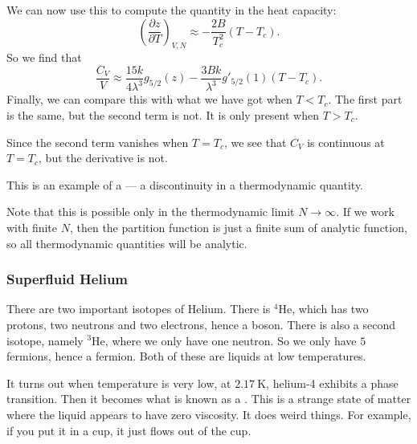 \documentclass[a4paper]{article}
\begin{document}
We can now use this to compute the quantity in the heat capacity:
\[
  \left(\frac{\partial z}{\partial T}\right)_{V, N} \approx -\frac{2B}{T_c^2}(T - T_c).
\]
So we find that
\[
  \frac{C_V}{V} \approx \frac{15 k}{4 \lambda^3} g_{5/2}(z) - \frac{3Bk}{\lambda^3} g'_{5/2}(1) (T - T_c).
\]
Finally, we can compare this with what we have got when $T < T_c$. The first part is the same, but the second term is not. It is only present when $T > T_c$.

Since the second term vanishes when $T = T_c$, we see that $C_V$ is continuous at $T = T_c$, but the derivative is not.
\begin{center}
\end{center}
This is an example of a  --- a discontinuity in a thermodynamic quantity.

Note that this is possible only in the thermodynamic limit $N \to \infty$. If we work with finite $N$, then the partition function is just a finite sum of analytic function, so all thermodynamic quantities will be analytic.

\subsubsection*{Superfluid Helium}
There are two important isotopes of Helium. There is $^4$He, which has two protons, two neutrons and two electrons, hence a boson. There is also a second isotope, namely $^3$He, where we only have one neutron. So we only have $5$ fermions, hence a fermion. Both of these are liquids at low temperatures.

It turns out when temperature is very low, at $\SI{2.17}{\kelvin}$, helium-4 exhibits a phase transition. Then it becomes what is known as a . This is a strange state of matter where the liquid appears to have zero viscosity. It does weird things. For example, if you put it in a cup, it just flows out of the cup.
\end{document}
